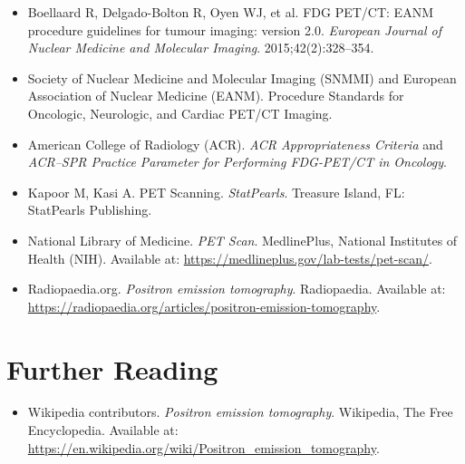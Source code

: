 \begin{itemize}
    \item Boellaard R, Delgado-Bolton R, Oyen WJ, et al. FDG PET/CT: EANM procedure guidelines for tumour imaging: version 2.0. \textit{European Journal of Nuclear Medicine and Molecular Imaging}. 2015;42(2):328--354.
    \item Society of Nuclear Medicine and Molecular Imaging (SNMMI) and European Association of Nuclear Medicine (EANM). Procedure Standards for Oncologic, Neurologic, and Cardiac PET/CT Imaging.
    \item American College of Radiology (ACR). \textit{ACR Appropriateness Criteria} and \textit{ACR--SPR Practice Parameter for Performing FDG-PET/CT in Oncology}.
    \item Kapoor M, Kasi A. PET Scanning. \textit{StatPearls}. Treasure Island, FL: StatPearls Publishing.
    \item National Library of Medicine. \textit{PET Scan}. MedlinePlus, National Institutes of Health (NIH). Available at: \url{https://medlineplus.gov/lab-tests/pet-scan/}.
    \item Radiopaedia.org. \textit{Positron emission tomography}. Radiopaedia. Available at: \url{https://radiopaedia.org/articles/positron-emission-tomography}.
\end{itemize}

\section{Further Reading}
\begin{itemize}
  \item Wikipedia contributors. \textit{Positron emission tomography}. Wikipedia, The Free Encyclopedia. Available at: \url{https://en.wikipedia.org/wiki/Positron_emission_tomography}.
\end{itemize}
